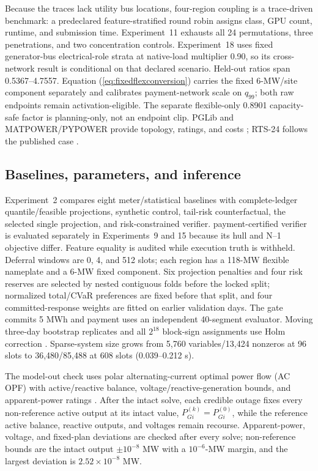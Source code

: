 \documentclass[10pt,journal]{IEEEtran}
\newcommand{\RiskSafe}{risk-constrained verifier}
\newcommand{\TailRisk}{tail-risk counterfactual}
\newcommand{\PaymentSafe}{payment-certified verifier}
\begin{document}
Because the traces lack utility bus locations, four-region coupling is a
trace-driven benchmark: a predeclared feature-stratified round robin assigns
class, GPU count, runtime, and submission time. Experiment~11 exhausts all 24
permutations, three penetrations, and two concentration controls. Experiment~18
uses fixed generator-bus electrical-role strata at native-load multiplier 0.90,
so its cross-network result is conditional on that declared scenario. Held-out
ratios span 0.5367--4.7557. Equation
(\ref{eq:fixedflexconversion}) carries the fixed 6-MW/site component separately
and calibrates payment-network scale on $q_{99}$; both raw endpoints remain
activation-eligible. The separate flexible-only 0.8901 capacity-safe factor is
planning-only, not an endpoint clip. PGLib and
MATPOWER/PYPOWER provide topology, ratings, and costs
\cite{babaeinejadsarookolaee2021pglib,zimmerman2011matpower}; RTS-24 follows
the published case \cite{grigg1999rts}.

\subsection{Baselines, parameters, and inference}

Experiment~2 compares eight meter/statistical baselines with complete-ledger
quantile/feasible projections, synthetic control, \TailRisk, the selected
single projection, and \RiskSafe. \PaymentSafe{} is evaluated separately in
Experiments~9 and 15 because its hull and N--1 objective differ. Feature
equality is audited while execution truth is withheld. Deferral windows are
0, 4, and 512 slots; each region has a 118-MW flexible nameplate and a 6-MW
fixed component. Six projection penalties and four risk reserves are selected
by nested contiguous folds before the locked split; normalized total/CVaR
preferences are fixed before that split, and four committed-response weights
are fitted on earlier validation days. The gate commits 5 MWh and payment uses
an independent 40-segment evaluator. Moving three-day bootstrap replicates and
all $2^{18}$ block-sign assignments use Holm correction
\cite{kunsch1989bootstrap,holm1979multiple}. Sparse-system size grows from
5,760 variables/13,424 nonzeros at 96 slots to 36,480/85,488 at 608 slots
(0.039--0.212 s).

The model-out check uses polar alternating-current optimal power flow (AC OPF)
with active/reactive balance, voltage/reactive-generation bounds, and
apparent-power ratings \cite{zimmerman2011matpower}. After the intact solve,
each credible outage fixes every non-reference active output at its intact
value, \(P_{Gi}^{(k)}=P_{Gi}^{(0)}\), while the reference active balance,
reactive outputs, and voltages remain recourse. Apparent-power, voltage, and
fixed-plan deviations are checked after every solve; non-reference bounds are
the intact output \(\pm10^{-8}\) MW with a \(10^{-6}\)-MW margin, and the
largest deviation is \(2.52\times10^{-8}\) MW.
\end{document}
